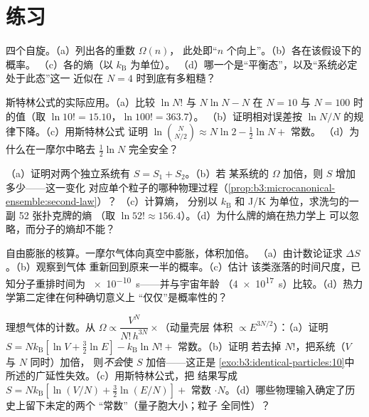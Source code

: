 \section{练习}

\begin{exercise}[$\star$]\label{exo:b3:microcanonical-ensemble:1}
四个自旋。（a）列出各的重数 $\Omega(n)$，
此处即“$n$ 个向上”。（b）各在该假设下的概率。
（c）各的熵（以 $k_{\text{B}}$ 为单位）。
（d）哪一个是“平衡态”，以及“系统必定处于此态”这一
近似在 $N = 4$ 时到底有多粗糙？
\end{exercise}

\begin{exercise}[$\star$]\label{exo:b3:microcanonical-ensemble:2}
斯特林公式的实际应用。（a）比较 $\ln N!$ 与 $N\ln N - N$ 在
$N = 10$ 与 $N = 100$ 时的值（取 $\ln10! = 15.10$，$\ln100! = 363.7$）。
（b）证明相对误差按 $\ln N/N$ 的规律下降。（c）用斯特林公式
证明 $\ln\binom N{N/2} \approx N\ln2 - \tfrac12\ln N + $ 常数。
（d）为什么在一摩尔中略去 $\tfrac12\ln N$ 完全安全？
\end{exercise}

\begin{exercise}[$\star$]\label{exo:b3:microcanonical-ensemble:3}
（a）证明对两个独立系统有 $S = S_1 + S_2$。（b）若
某系统的 $\Omega$ 加倍，则 $S$ 增加多少——这一变化
对应单个粒子的哪种物理过程（\cref{prop:b3:microcanonical-ensemble:second-law}）？
（c）计算熵，
分别以 $k_{\text{B}}$ 和 J/K 为单位，求洗匀的一副 52 张扑克牌的熵
（取 $\ln52! \approx 156.4$）。（d）为什么牌的熵在热力学上
可以忽略，而分子的熵却不能？
\end{exercise}

\begin{exercise}[$\star$]\label{exo:b3:microcanonical-ensemble:4}
自由膨胀的核算。一摩尔气体向真空中膨胀，体积加倍。
（a）由计数论证求 $\Delta S$。（b）观察到气体
重新回到原来一半的概率。（c）估计
该类涨落的时间尺度，已知分子重排时间为
\qty{e-10}{s}——并与宇宙年龄
（\qty{4e17}{s}）比较。（d）热力学第二定律在何种确切意义上
“仅仅”是概率性的？
\end{exercise}

\begin{exercise}[$\star\star$]\label{exo:b3:microcanonical-ensemble:5}
理想气体的计数。从
$\Omega \propto \dfrac{V^N}{N!\,h^{3N}}\times$（动量壳层
体积 $\propto E^{3N/2}$）：（a）证明 $S = Nk_{\text{B}}[\ln V +
\tfrac32\ln E] - k_{\text{B}}\ln N! + $ 常数。（b）证明
若去掉 $N!$，把系统（$V$ 与 $N$ 同时）加倍，
则\emph{不会}使 $S$ 加倍——这正是
\cref{exo:b3:identical-particles:10}中所述的广延性失效。（c）用斯特林公式，把
结果写成 $S = Nk_{\text{B}}[\ln(V/N) + \tfrac32\ln(E/N)]
+ $ 常数 $\cdot N$。（d）哪些物理输入确定了历史上留下未定的两个
“常数”（量子胞大小；粒子
全同性）？
\end{exercise}

